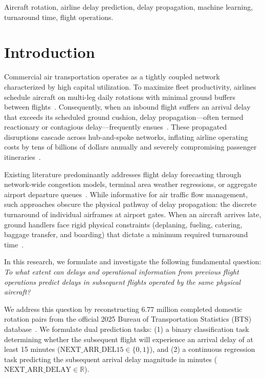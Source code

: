 \documentclass[conference]{IEEEtran}
\begin{document}
\begin{IEEEkeywords}
Aircraft rotation, airline delay prediction, delay propagation, machine learning, turnaround time, flight operations.
\end{IEEEkeywords}

\section{Introduction}
Commercial air transportation operates as a tightly coupled network characterized by high capital utilization. To maximize fleet productivity, airlines schedule aircraft on multi-leg daily rotations with minimal ground buffers between flights~\cite{wu2005inherent}. Consequently, when an inbound flight suffers an arrival delay that exceeds its scheduled ground cushion, delay propagation---often termed reactionary or contagious delay---frequently ensues~\cite{pyrgiotis2013modelling}. These propagated disruptions cascade across hub-and-spoke networks, inflating airline operating costs by tens of billions of dollars annually and severely compromising passenger itineraries~\cite{campanelli2016modeling}.

Existing literature predominantly addresses flight delay forecasting through network-wide congestion models, terminal area weather regressions, or aggregate airport departure queues~\cite{rebollo2014characterization, sternberg2017review}. While informative for air traffic flow management, such approaches obscure the physical pathway of delay propagation: the discrete turnaround of individual airframes at airport gates. When an aircraft arrives late, ground handlers face rigid physical constraints (deplaning, fueling, catering, baggage transfer, and boarding) that dictate a minimum required turnaround time~\cite{evler2021airline}.

In this research, we formulate and investigate the following fundamental question: \textit{To what extent can delays and operational information from previous flight operations predict delays in subsequent flights operated by the same physical aircraft?}

We address this question by reconstructing 6.77 million completed domestic rotation pairs from the official 2025 Bureau of Transportation Statistics (BTS) database~\cite{bts2025ontime}. We formulate dual prediction tasks: (1) a binary classification task determining whether the subsequent flight will experience an arrival delay of at least 15 minutes ($\text{NEXT\_ARR\_DEL15} \in \{0, 1\}$), and (2) a continuous regression task predicting the subsequent arrival delay magnitude in minutes ($\text{NEXT\_ARR\_DELAY} \in \mathbb{R}$). 
\end{document}
